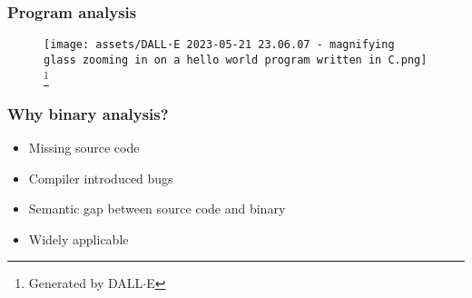 \begin{frame}

	\frametitle{Program analysis}
	\begin{figure}
		\texttt{[image: assets/DALL·E 2023-05-21 23.06.07 - magnifying glass zooming in on a hello world program written in C.png]}
		\footnote{\tiny Generated by DALL$\cdot$E}
	\end{figure}
\end{frame}

\begin{frame}

	\frametitle{Why binary analysis?}
	\begin{itemize}
		\item Missing source code
		\item Compiler introduced bugs
		\item Semantic gap between source code and binary
		\item Widely applicable
	\end{itemize}
\end{frame}

